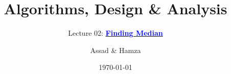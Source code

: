 \documentclass[10pt,aspectratio=43]{beamer}
\title{Algorithms, Design \& Analysis}
\subtitle{Lecture 02: \href{https://docs.google.com/document/d/1RkYqY9OvATMPILDVtHyNG_6apl93wdmuoxnDB3_DeLw/edit?usp=sharing}{\textcolor{blue}{\textbf{Finding Median}}}}
\author[bscs23213 \& bscs23174]{Assad \& Hamza}
\institute[ITU]{Information Technology University}
\date{\today}
\begin{document}
\begin{frame}
    \titlepage
\end{frame}



\end{document}
